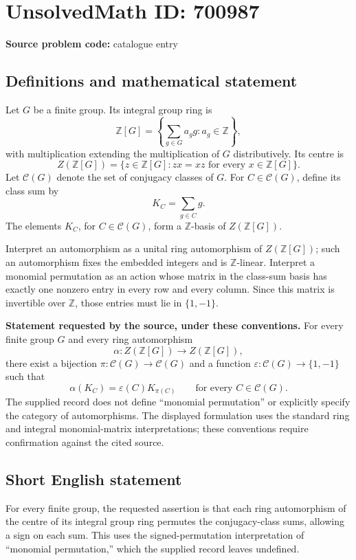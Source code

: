 \documentclass[11pt]{article}
\newcommand{\Z}{\mathbb{Z}}
\begin{document}
\section*{UnsolvedMath ID: 700987}
\textbf{Source problem code:} catalogue entry
\subsection{Definitions and mathematical statement}
Let \(G\) be a finite group. Its integral group ring is
\[
\Z[G]=\left\{\sum_{g\in G}a_g g:a_g\in\Z\right\},
\]
with multiplication extending the multiplication of \(G\) distributively. Its centre is
\[
Z(\Z[G])=\{z\in\Z[G]:zx=xz\text{ for every }x\in\Z[G]\}.
\]
Let \(\mathcal C(G)\) denote the set of conjugacy classes of \(G\). For \(C\in\mathcal C(G)\), define its class sum by
\[
K_C=\sum_{g\in C}g.
\]
The elements \(K_C\), for \(C\in\mathcal C(G)\), form a \(\Z\)-basis of \(Z(\Z[G])\).

Interpret an automorphism as a unital ring automorphism of \(Z(\Z[G])\); such an automorphism fixes the embedded integers and is \(\Z\)-linear. Interpret a monomial permutation as an action whose matrix in the class-sum basis has exactly one nonzero entry in every row and every column. Since this matrix is invertible over \(\Z\), those entries must lie in \(\{1,-1\}\).

\textbf{Statement requested by the source, under these conventions.} For every finite group \(G\) and every ring automorphism
\[
\alpha:Z(\Z[G])\longrightarrow Z(\Z[G]),
\]
there exist a bijection \(\pi:\mathcal C(G)\longrightarrow\mathcal C(G)\) and a function \(\varepsilon:\mathcal C(G)\longrightarrow\{1,-1\}\) such that
\[
\alpha(K_C)=\varepsilon(C)K_{\pi(C)}
\qquad\text{for every }C\in\mathcal C(G).
\]
The supplied record does not define ``monomial permutation'' or explicitly specify the category of automorphisms. The displayed formulation uses the standard ring and integral monomial-matrix interpretations; these conventions require confirmation against the cited source.
\subsection{Short English statement}
For every finite group, the requested assertion is that each ring automorphism of the centre of its integral group ring permutes the conjugacy-class sums, allowing a sign on each sum. This uses the signed-permutation interpretation of ``monomial permutation,'' which the supplied record leaves undefined.
\end{document}
